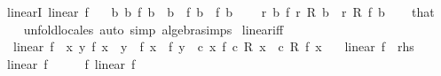 \begin{isabellebody}
\ linearI{\isacharcolon}{\kern0pt}\ {\isachardoublequoteopen}linear\ f{\isachardoublequoteclose}\isanewline
\ \ \ {\isachardoublequoteopen}{\isasymAnd}b{}\ b{}{\isachardot}{\kern0pt}\ f\ {\isacharparenleft}{\kern0pt}b{}\ {\isacharplus}{\kern0pt}\ b{}{\isacharparenright}{\kern0pt}\ {\isacharequal}{\kern0pt}\ f\ b{}\ {\isacharplus}{\kern0pt}\ f\ b{}{\isachardoublequoteclose}\isanewline
\ \ \ \ {\isachardoublequoteopen}{\isasymAnd}r\ b{\isachardot}{\kern0pt}\ f\ {\isacharparenleft}{\kern0pt}r\ {\isacharasterisk}{\kern0pt}\isactrlsub R\ b{\isacharparenright}{\kern0pt}\ {\isacharequal}{\kern0pt}\ r\ {\isacharasterisk}{\kern0pt}\isactrlsub R\ f\ b{\isachardoublequoteclose}\isanewline
%
\isadelimproof
\ \ %
\endisadelimproof
%
\isatagproof
{}\isamarkupfalse%
\ that\isanewline
\ \ \isamarkupfalse%
\ unfold{\isacharunderscore}{\kern0pt}locales\ {\isacharparenleft}{\kern0pt}auto\ simp{\isacharcolon}{\kern0pt}\ algebra{\isacharunderscore}{\kern0pt}simps{\isacharparenright}{\kern0pt}%
\endisatagproof
{\isafoldproof}%
%
\isadelimproof
\isanewline
%
\endisadelimproof
\isanewline
{}\isamarkupfalse%
\ linear{\isacharunderscore}{\kern0pt}iff{\isacharcolon}{\kern0pt}\isanewline
\ \ {\isachardoublequoteopen}linear\ f\ {\isasymlongleftrightarrow}\ {\isacharparenleft}{\kern0pt}{\isasymforall}x\ y{\isachardot}{\kern0pt}\ f\ {\isacharparenleft}{\kern0pt}x\ {\isacharplus}{\kern0pt}\ y{\isacharparenright}{\kern0pt}\ {\isacharequal}{\kern0pt}\ f\ x\ {\isacharplus}{\kern0pt}\ f\ y{\isacharparenright}{\kern0pt}\ {\isasymand}\ {\isacharparenleft}{\kern0pt}{\isasymforall}c\ x{\isachardot}{\kern0pt}\ f\ {\isacharparenleft}{\kern0pt}c\ {\isacharasterisk}{\kern0pt}\isactrlsub R\ x{\isacharparenright}{\kern0pt}\ {\isacharequal}{\kern0pt}\ c\ {\isacharasterisk}{\kern0pt}\isactrlsub R\ f\ x{\isacharparenright}{\kern0pt}{\isachardoublequoteclose}\isanewline
\ \ {\isacharparenleft}{\kern0pt}\ {\isachardoublequoteopen}linear\ f\ {\isasymlongleftrightarrow}\ {\isacharquery}{\kern0pt}rhs{\isachardoublequoteclose}{\isacharparenright}{\kern0pt}\isanewline
%
\isadelimproof
%
\endisadelimproof
%
\isatagproof
{}\isamarkupfalse%
\isanewline
\ \ \isamarkupfalse%
\ {\isachardoublequoteopen}linear\ f{\isachardoublequoteclose}\isanewline
\ \ \isamarkupfalse%
\ \isamarkupfalse%
\ f{\isacharcolon}{\kern0pt}\ linear\ f\ \isacommand{{\isachardot}{\kern0pt}}\isamarkupfalse%
\isanewline
\ \ \isamarkupfalse%

\end{isabellebody}
